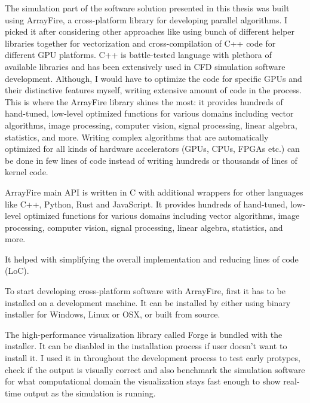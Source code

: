 The simulation part of the software solution presented in this thesis was built using ArrayFire, a cross-platform library for developing parallel algorithms. I picked it after considering other approaches like using bunch of different helper libraries together for vectorization and cross-compilation of C++ code for different GPU platforms. C++ is battle-tested language with plethora of available libraries and has been extensively used in CFD simulation software development. Although, I would have to optimize the code for specific GPUs and their distinctive features myself, writing extensive amount of code in the process. This is where the ArrayFire library shines the most: it provides hundreds of hand-tuned, low-level optimized functions for various domains including vector algorithms, image processing, computer vision, signal processing, linear algebra, statistics, and more. Writing complex algorithms that are automatically optimized for all kinds of hardware accelerators (GPUs, CPUs, FPGAs etc.) can be done in few lines of code instead of writing hundreds or thousands of lines of kernel code.

ArrayFire main API is written in C with additional wrappers for other languages like C++, Python, Rust and JavaScript. It provides hundreds of hand-tuned, low-level optimized functions for various domains including vector algorithms, image processing, computer vision, signal processing, linear algebra, statistics, and more.

It helped with simplifying the overall implementation and reducing lines of code (LoC).

To start developing cross-platform software with ArrayFire, first it has to be installed on a development machine. It can be installed by either using binary installer for Windows, Linux or OSX, or built from source.

The high-performance visualization library called Forge is bundled with the installer. It can be disabled in the installation process if user doesn't want to install it. I used it in throughout the development process to test early protypes, check if the output is visually correct and also benchmark the simulation software for what computational domain the visualization stays fast enough to show real-time output as the simulation is running.



